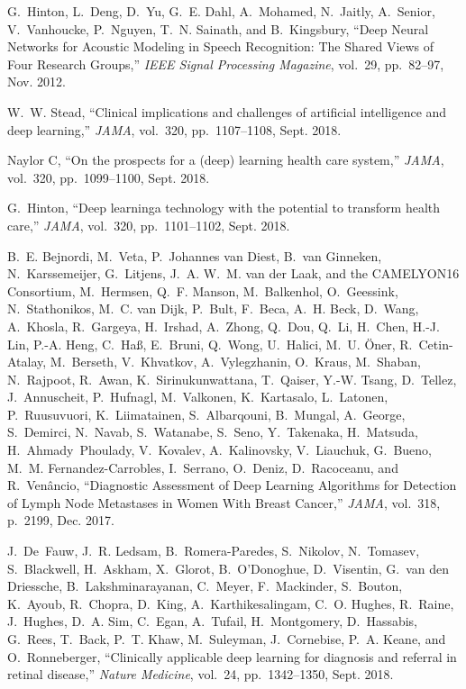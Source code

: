 \documentclass{article}
\begin{document}
\begin{thebibliography}{10}
G.~Hinton, L.~Deng, D.~Yu, G.~E. Dahl, A.~Mohamed, N.~Jaitly, A.~Senior,
  V.~Vanhoucke, P.~Nguyen, T.~N. Sainath, and B.~Kingsbury, ``Deep {{Neural
  Networks}} for {{Acoustic Modeling}} in {{Speech Recognition}}: {{The Shared
  Views}} of {{Four Research Groups}},'' {\em IEEE Signal Processing Magazine},
  vol.~29, pp.~82--97, Nov. 2012.

W.~W. Stead, ``Clinical implications and challenges of artificial intelligence
  and deep learning,'' {\em JAMA}, vol.~320, pp.~1107--1108, Sept. 2018.

{Naylor C}, ``On the prospects for a (deep) learning health care system,'' {\em
  JAMA}, vol.~320, pp.~1099--1100, Sept. 2018.

G.~Hinton, ``Deep learning\textemdash{}a technology with the potential to
  transform health care,'' {\em JAMA}, vol.~320, pp.~1101--1102, Sept. 2018.

B.~E. Bejnordi, M.~Veta, P.~{Johannes van Diest}, B.~{van Ginneken},
  N.~Karssemeijer, G.~Litjens, J.~A. W.~M. {van der Laak}, {and the CAMELYON16
  Consortium}, M.~Hermsen, Q.~F. Manson, M.~Balkenhol, O.~Geessink,
  N.~Stathonikos, M.~C. {van Dijk}, P.~Bult, F.~Beca, A.~H. Beck, D.~Wang,
  A.~Khosla, R.~Gargeya, H.~Irshad, A.~Zhong, Q.~Dou, Q.~Li, H.~Chen, H.-J.
  Lin, P.-A. Heng, C.~Ha\ss, E.~Bruni, Q.~Wong, U.~Halici, M.~U. \"Oner,
  R.~{Cetin-Atalay}, M.~Berseth, V.~Khvatkov, A.~Vylegzhanin, O.~Kraus,
  M.~Shaban, N.~Rajpoot, R.~Awan, K.~Sirinukunwattana, T.~Qaiser, Y.-W. Tsang,
  D.~Tellez, J.~Annuscheit, P.~Hufnagl, M.~Valkonen, K.~Kartasalo, L.~Latonen,
  P.~Ruusuvuori, K.~Liimatainen, S.~Albarqouni, B.~Mungal, A.~George,
  S.~Demirci, N.~Navab, S.~Watanabe, S.~Seno, Y.~Takenaka, H.~Matsuda,
  H.~Ahmady~Phoulady, V.~Kovalev, A.~Kalinovsky, V.~Liauchuk, G.~Bueno, M.~M.
  {Fernandez-Carrobles}, I.~Serrano, O.~Deniz, D.~Racoceanu, and R.~Ven\^ancio,
  ``Diagnostic {{Assessment}} of {{Deep Learning Algorithms}} for {{Detection}}
  of {{Lymph Node Metastases}} in {{Women With Breast Cancer}},'' {\em JAMA},
  vol.~318, p.~2199, Dec. 2017.

J.~De~Fauw, J.~R. Ledsam, B.~{Romera-Paredes}, S.~Nikolov, N.~Tomasev,
  S.~Blackwell, H.~Askham, X.~Glorot, B.~O'Donoghue, D.~Visentin, G.~{van den
  Driessche}, B.~Lakshminarayanan, C.~Meyer, F.~Mackinder, S.~Bouton, K.~Ayoub,
  R.~Chopra, D.~King, A.~Karthikesalingam, C.~O. Hughes, R.~Raine, J.~Hughes,
  D.~A. Sim, C.~Egan, A.~Tufail, H.~Montgomery, D.~Hassabis, G.~Rees, T.~Back,
  P.~T. Khaw, M.~Suleyman, J.~Cornebise, P.~A. Keane, and O.~Ronneberger,
  ``Clinically applicable deep learning for diagnosis and referral in retinal
  disease,'' {\em Nature Medicine}, vol.~24, pp.~1342--1350, Sept. 2018.


\end{thebibliography}
\end{document}
